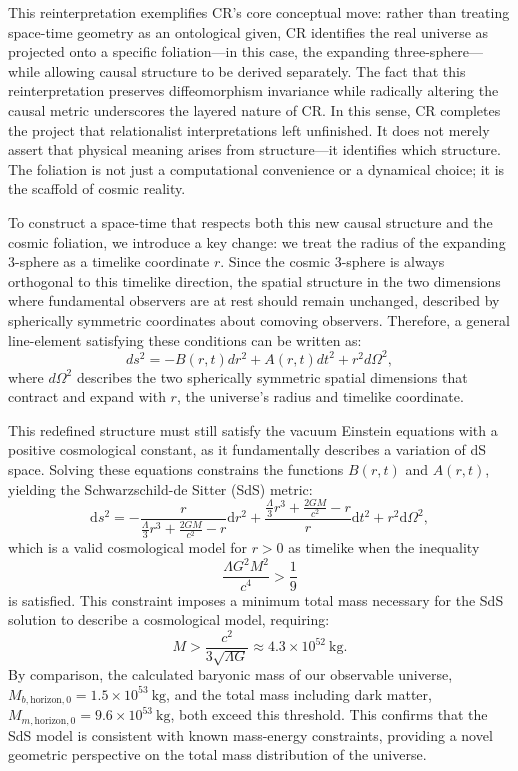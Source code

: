 \documentclass[12pt]{book}
\begin{document}
This reinterpretation exemplifies CR's core conceptual move: rather than treating space-time geometry as an ontological given, CR identifies the real universe as projected onto a specific foliation---in this case, the expanding three-sphere---while allowing causal structure to be derived separately. The fact that this reinterpretation preserves diffeomorphism invariance while radically altering the causal metric underscores the layered nature of CR. In this sense, CR completes the project that relationalist interpretations left unfinished. It does not merely assert that physical meaning arises from structure---it identifies which structure. The foliation is not just a computational convenience or a dynamical choice; it is the scaffold of cosmic reality.

To construct a space-time that respects both this new causal structure and the cosmic foliation, we introduce a key change: we treat the radius of the expanding 3-sphere as a timelike coordinate $r$. Since the cosmic 3-sphere is always orthogonal to this timelike direction, the spatial structure in the two dimensions where fundamental observers are at rest should remain unchanged, described by spherically symmetric coordinates about comoving observers. Therefore, a general line-element satisfying these conditions can be written as:
\begin{equation}
    ds^2=-B(r,t)dr^2+A(r,t)dt^2+r^2d\Omega^2,\label{eq:JB}
\end{equation}
where $d\Omega^2$ describes the two spherically symmetric spatial dimensions that contract and expand with $r$, the universe's radius and timelike coordinate.

This redefined structure must still satisfy the vacuum Einstein equations with a positive cosmological constant, as it fundamentally describes a variation of dS space. Solving these equations constrains the functions $B(r,t)$ and $A(r,t)$, yielding the Schwarzschild-de Sitter (SdS) metric:
\begin{equation}
    \mathrm{d}s^2=-\frac{r}{\frac{\Lambda}{3}r^3+\frac{2GM}{c^2}-r}\mathrm{d}r^2+\frac{\frac{\Lambda}{3}r^3+\frac{2GM}{c^2}-r}{r}\mathrm{d}t^2+r^2\mathrm{d}\Omega^2,\label{eq:SdS_statical}
\end{equation}
which is a valid cosmological model for $r>0$ as timelike when the inequality
\begin{equation}
    \frac{\Lambda G^2 M^2}{c^4} > \frac{1}{9}
\end{equation}
is satisfied. This constraint imposes a minimum total mass necessary for the SdS solution to describe a cosmological model, requiring:
\begin{equation}
M > \frac{c^2}{3\sqrt{\Lambda G}} \approx 4.3 \times 10^{52}~\text{kg}.
\end{equation}
By comparison, the calculated baryonic mass of our observable universe, $M_{b,\text{horizon},0} = 1.5 \times 10^{53}~\text{kg}$, and the total mass including dark matter, $M_{m,\text{horizon},0} = 9.6 \times 10^{53}~\text{kg}$, both exceed this threshold. This confirms that the SdS model is consistent with known mass-energy constraints, providing a novel geometric perspective on the total mass distribution of the universe.
\end{document}
